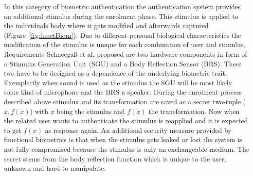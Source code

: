 \newline
In this category of biometric authentication the authentication system provides an additional stimulus during the enrolment phase. This stimulus is applied to the individuals body where it gets modified and afterwards captured (Figure~\ref{fig:functBiom}).
Due to different personal biological characteristics the modification of the stimulus is unique for each combination of user and stimulus.\newline
Requirements Schneegaß et al. proposed are two hardware components in form of a Stimulus Generation Unit (SGU) and a Body Reflection Sensor (BRS). These two have to be designed as a dependence of the underlying biometric trait. Exemplarily when sound is used as the stimulus the SGU will be most likely some kind of microphone and the BRS a speaker.\newline
During the enrolment process described above stimulus and its transformation are saved as a secret two-tuple ($x, f(x)$) with $ x $ being the stimulus and $ f(x) $ the transformation. Now when the related user wants to authenticate the stimulus is reapplied and it is expected to get $f(x)$ as response again. An additional security measure provided by functional biometrics is that when the stimulus gets leaked or lost the system is not fully compromised because the stimulus is only an exchangeable medium. The secret stems from the body reflection function which is unique to the user, unknown and hard to manipulate.
